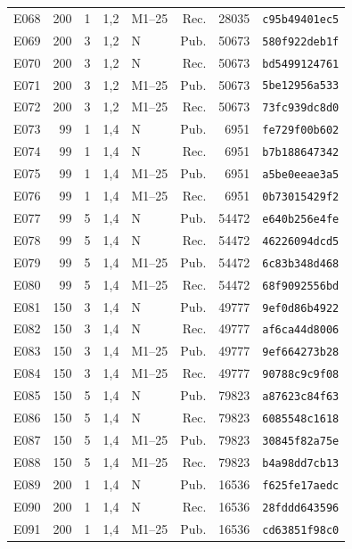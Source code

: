 \begin{longtable}{lrrrlrrl}
E068 & 200 & 1 & 1,2 & M1--25 & Rec. & 28035 & \texttt{c95b49401ec5} \\
E069 & 200 & 3 & 1,2 & N & Pub. & 50673 & \texttt{580f922deb1f} \\
E070 & 200 & 3 & 1,2 & N & Rec. & 50673 & \texttt{bd5499124761} \\
E071 & 200 & 3 & 1,2 & M1--25 & Pub. & 50673 & \texttt{5be12956a533} \\
E072 & 200 & 3 & 1,2 & M1--25 & Rec. & 50673 & \texttt{73fc939dc8d0} \\
E073 & 99 & 1 & 1,4 & N & Pub. & 6951 & \texttt{fe729f00b602} \\
E074 & 99 & 1 & 1,4 & N & Rec. & 6951 & \texttt{b7b188647342} \\
E075 & 99 & 1 & 1,4 & M1--25 & Pub. & 6951 & \texttt{a5be0eeae3a5} \\
E076 & 99 & 1 & 1,4 & M1--25 & Rec. & 6951 & \texttt{0b73015429f2} \\
E077 & 99 & 5 & 1,4 & N & Pub. & 54472 & \texttt{e640b256e4fe} \\
E078 & 99 & 5 & 1,4 & N & Rec. & 54472 & \texttt{46226094dcd5} \\
E079 & 99 & 5 & 1,4 & M1--25 & Pub. & 54472 & \texttt{6c83b348d468} \\
E080 & 99 & 5 & 1,4 & M1--25 & Rec. & 54472 & \texttt{68f9092556bd} \\
E081 & 150 & 3 & 1,4 & N & Pub. & 49777 & \texttt{9ef0d86b4922} \\
E082 & 150 & 3 & 1,4 & N & Rec. & 49777 & \texttt{af6ca44d8006} \\
E083 & 150 & 3 & 1,4 & M1--25 & Pub. & 49777 & \texttt{9ef664273b28} \\
E084 & 150 & 3 & 1,4 & M1--25 & Rec. & 49777 & \texttt{90788c9c9f08} \\
E085 & 150 & 5 & 1,4 & N & Pub. & 79823 & \texttt{a87623c84f63} \\
E086 & 150 & 5 & 1,4 & N & Rec. & 79823 & \texttt{6085548c1618} \\
E087 & 150 & 5 & 1,4 & M1--25 & Pub. & 79823 & \texttt{30845f82a75e} \\
E088 & 150 & 5 & 1,4 & M1--25 & Rec. & 79823 & \texttt{b4a98dd7cb13} \\
E089 & 200 & 1 & 1,4 & N & Pub. & 16536 & \texttt{f625fe17aedc} \\
E090 & 200 & 1 & 1,4 & N & Rec. & 16536 & \texttt{28fddd643596} \\
E091 & 200 & 1 & 1,4 & M1--25 & Pub. & 16536 & \texttt{cd63851f98c0} \\

\end{longtable}
